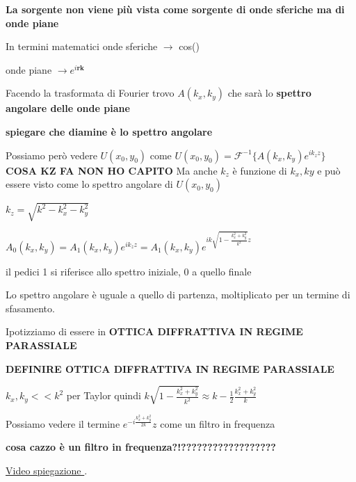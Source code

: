 \documentclass{article}
\begin{document}
\textbf{La sorgente non viene più vista come sorgente di onde sferiche ma di onde piane}


In termini matematici onde sferiche $\longrightarrow$ cos()

 onde piane $\longrightarrow  e^{i \textbf{r} \textbf{k}}$
 
Facendo la trasformata di Fourier trovo $A(k_{x},k_{y})$ che sarà lo \textbf{spettro angolare delle onde piane}

\textbf{spiegare che diamine è lo spettro angolare}

Possiamo però vedere $U(x_{0},y_{0})$ come $U(x_{0},y_{0})=\mathscr{F}^{-1} \{ A(k_{x},k_{y}) e^{i k_{z} z} \}$ 
\textbf{COSA KZ FA NON HO CAPITO}
Ma anche $k_{z}$ è funzione di $k_{x}, k{y}$ e può essere visto come lo spettro angolare di $U(x_{0},y_{0})$

$k_{z}=\sqrt{k ^{2} - k_{x} ^{2} - k_{y} ^{2}}$

$ A_{0}(k_{x},k_{y})=A_{1}(k_{x},k_{y}) e^{i k_{z} z} = A_{1}(k_{x},k_{y}) e^{i k \sqrt{1 - \frac{ k_{x} ^{2} + k_{y} ^{2}}{k^{2}}} z} $

il pedici 1 si riferisce allo spettro iniziale, 0 a quello finale

Lo spettro angolare è uguale a quello di partenza, moltiplicato per un termine di sfasamento.

Ipotizziamo di essere in \textbf{OTTICA DIFFRATTIVA IN REGIME PARASSIALE}

\textbf{DEFINIRE OTTICA DIFFRATTIVA IN REGIME PARASSIALE }

$k_{x},k_{y} << k^{2}$
per Taylor quindi
$k \sqrt{1 - \frac{ k_{x} ^{2} + k_{y} ^{2} }{ k^{2} }}\approx k -\frac{1}{2} \frac{k_{x} ^{2} + k_{y} ^{2}}{k}$

Possiamo vedere il termine $ e^{- i \frac{k_{x} ^{2} + k_{y} ^{2} }{2k}} z$ come un filtro in frequenza 

\textbf{cosa cazzo è un filtro in frequenza?!??????????????????}















\href{https://www.youtube.com/watch?v=wZZ7oFKsKzY&t=235s}{Video spiegazione }.  %
\end{document}
